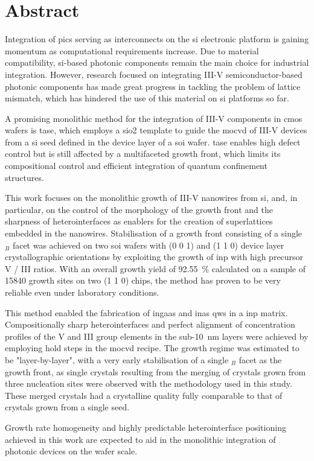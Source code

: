 \chapter{Abstract}

Integration of \acl{pic}s serving as interconnects on the \acl{si} electronic platform is gaining momentum as computational requirements increase. Due to material compatibility, \acl{si}-based photonic components remain the main choice for industrial integration. However, research focused on integrating III-V semiconductor-based photonic components has made great progress in tackling the problem of lattice mismatch, which has hindered the use of this material on \acl{si} platforms so far.

A promising monolithic method for the integration of III-V components in \acs{cmos} wafers is \acf{tase}, which employs a \acf{sio2} template to guide the \acf{mocvd} of III-V devices from a \acl{si} seed defined in the device layer of a \acf{soi} wafer. \acs{tase} enables high defect control but is still affected by a multifaceted growth front, which limits its compositional control and efficient integration of quantum confinement structures.

This work focuses on the monolithic growth of III-V nanowires from \acl{si}, and, in particular, on the control of the morphology of the growth front and the sharpness of heterointerfaces as enablers for the creation of superlattices embedded in the nanowires. Stabilisation of a growth front consisting of a single \(_B\) facet was achieved on two \acs{soi} wafers with \hkl(0 0 1) and \hkl(1 1 0) device layer crystallographic orientations by exploiting the growth of \acs{inp} with high precursor V / III ratios. With an overall growth yield of \qty{92.55}{\%} calculated on a sample of \num{15840} growth sites on two \hkl(1 1 0) chips, the method has proven to be very reliable even under laboratory conditions.

This method enabled the fabrication of \acs{ingaas} and \acs{inas} \acl{qw}s in a \acs{inp} matrix. Compositionally sharp heterointerfaces and perfect alignment of concentration profiles of the V and III group elements in the sub-\qty{10}{\nano\metre} layers were achieved by employing hold steps in the \acs{mocvd} recipe. The growth regime was estimated to be "layer-by-layer", with a very early stabilisation of a single \(_B\) facet as the growth front, as single crystals resulting from the merging of crystals grown from three nucleation sites were observed with the methodology used in this study. These merged crystals had a crystalline quality fully comparable to that of crystals grown from a single seed.

Growth rate homogeneity and highly predictable heterointerface positioning achieved in this work are expected to aid in the monolithic integration of photonic devices on the wafer scale.